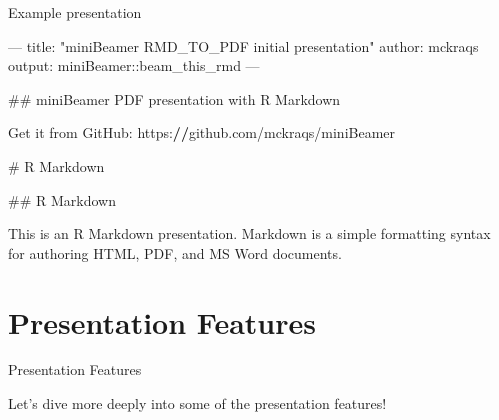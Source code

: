 \documentclass[ignorenonframetext,]{beamer}
\newenvironment{Shaded}{}{}
\newcommand{\CommentTok}[1]{\textcolor[rgb]{0.00,0.50,0.00}{#1}}
\newcommand{\ControlFlowTok}[1]{\textcolor[rgb]{0.00,0.00,1.00}{#1}}
\newcommand{\ErrorTok}[1]{\textcolor[rgb]{1.00,0.00,0.00}{\textbf{#1}}}
\newcommand{\NormalTok}[1]{#1}
\newcommand{\OperatorTok}[1]{#1}
\newcommand{\StringTok}[1]{\textcolor[rgb]{0.00,0.50,0.50}{#1}}
\begin{document}
\begin{frame}[fragile]{Example presentation}
\protect\hypertarget{example-presentation}{}

\scriptsize

\begin{Shaded}
\begin{Highlighting}[]
\OperatorTok{---}
\NormalTok{title}\OperatorTok{:}\StringTok{ "miniBeamer RMD_TO_PDF initial presentation"}
\NormalTok{author}\OperatorTok{:}\StringTok{ }\NormalTok{mckraqs}
\NormalTok{output}\OperatorTok{:}\StringTok{ }\NormalTok{miniBeamer}\OperatorTok{::}\NormalTok{beam_this_rmd}
\OperatorTok{---}

\CommentTok{## miniBeamer PDF presentation with R Markdown}

\NormalTok{Get it from GitHub}\OperatorTok{:}\StringTok{ }\NormalTok{https}\OperatorTok{:}\ErrorTok{//}\NormalTok{github.com}\OperatorTok{/}\NormalTok{mckraqs}\OperatorTok{/}\NormalTok{miniBeamer}

\CommentTok{# R Markdown}

\CommentTok{## R Markdown}

\NormalTok{This is an R Markdown presentation. Markdown is a simple formatting syntax}
\ControlFlowTok{for}\NormalTok{ authoring HTML, PDF, and MS Word documents.}
\end{Highlighting}
\end{Shaded}

\end{frame}

\hypertarget{presentation-features}{%
\section{Presentation Features}\label{presentation-features}}

\begin{frame}{Presentation Features}
\protect\hypertarget{presentation-features-1}{}

Let's dive more deeply into some of the presentation features!

\end{frame}
\end{document}
